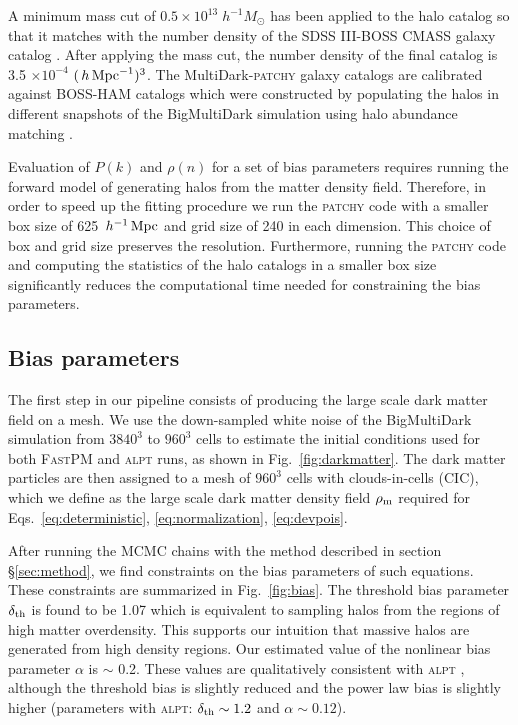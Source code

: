 \documentclass[english,usenatbib]{mn2e}
\newcommand{\mperh}{\,h^{-1}\,{\rm Mpc}}
\newcommand{\hperm}{\,h\,{\rm Mpc}^{-1}}
\begin{document}
A minimum mass cut of $0.5 \times 10^{13} \; h^{-1} M_{\odot}$ has been applied to the halo catalog so that it matches with the number density of the SDSS III-BOSS CMASS galaxy catalog \citep{white2011,Dawson2013}. After applying the mass cut, the number density of the final catalog is 3.5 $\times 10^{-4}$ $(\hperm)^{3}$. The MultiDark-\textsc{patchy} galaxy catalogs \citep{kitaura2016} are calibrated against BOSS-HAM catalogs which were constructed by populating the halos in different snapshots of the BigMultiDark simulation using halo abundance matching \citep{sergio2016}.   

Evaluation of $P(k)$ and $\rho(n)$ for a set of bias parameters requires running the forward model of generating halos from the matter density field. Therefore, in order to speed up the fitting procedure we run the \textsc{patchy} code with a smaller box size of 625 $\mperh$ and grid size of 240 in each dimension. This choice of box and grid size preserves the resolution. Furthermore, running the \textsc{patchy} code and computing the statistics of the halo catalogs in a smaller box size significantly reduces the computational time needed for constraining the bias parameters.

\subsection{Bias parameters}

The first step in our pipeline consists of producing the large scale dark matter field on a mesh. We use the down-sampled  white noise of the BigMultiDark simulation from $3840^3$ to $960^3$ cells to estimate the initial conditions used for both \textsc{FastPM} and \textsc{alpt} runs, as shown in Fig.~\ref{fig:darkmatter}. The dark matter particles are then assigned to a mesh of $960^3$ cells with clouds-in-cells (CIC), which we define as the large scale dark matter density field $\rho_{\rm m}$ required for Eqs.~\ref{eq:deterministic}, \ref{eq:normalization}, \ref{eq:devpois}. 

After running the MCMC chains with the method described in section \S \ref{sec:method}, we find constraints on the bias parameters of such equations. These constraints are summarized in Fig.~\ref{fig:bias}.  
The threshold bias parameter $\delta_{\rm th}$ is found to be 1.07 which is equivalent to sampling halos from the regions of high matter overdensity. This supports our intuition that massive halos are generated from high density regions. Our estimated value of the nonlinear bias parameter $\alpha$ is $\sim$ 0.2. These values are qualitatively consistent with \textsc{alpt} \citep{kitaura2014}, although the threshold bias is slightly reduced and the power law bias is slightly higher (parameters with \textsc{alpt}: $\delta_{\rm th} \sim 1.2$ and $\alpha \sim 0.12$).
\end{document}
